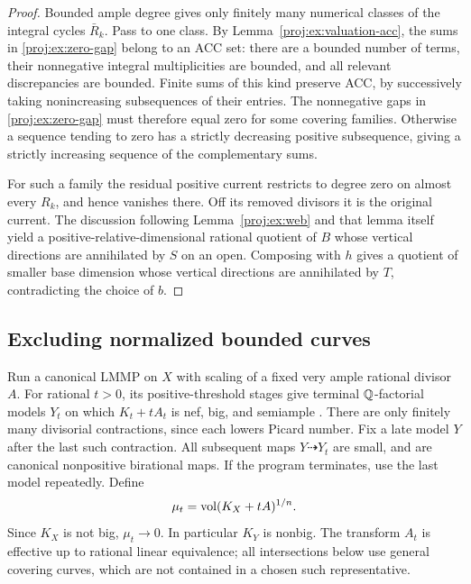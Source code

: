 \begin{proof}
Bounded ample degree gives only finitely many numerical
classes of the integral cycles \(\bar R_k\). Pass to one
class. By Lemma~\ref{proj:ex:valuation-acc}, the sums in
\eqref{proj:ex:zero-gap} belong to an ACC set: there are a bounded
number of terms, their nonnegative integral multiplicities
are bounded, and all relevant discrepancies are bounded.
Finite sums of this kind preserve ACC, by successively
taking nonincreasing subsequences of their entries.
The nonnegative gaps in \eqref{proj:ex:zero-gap} must therefore
equal zero for some covering families. Otherwise a sequence
tending to zero has a strictly decreasing positive
subsequence, giving a strictly increasing sequence of the
complementary sums.

For such a family the residual positive current restricts
to degree zero on almost every \(R_k\), and hence vanishes
there. Off its removed divisors it is the original current.
The discussion following Lemma~\ref{proj:ex:web} and that lemma
itself yield a positive-relative-dimensional rational
quotient of \(B\) whose vertical directions are annihilated
by \(S\) on an open. Composing with \(h\) gives a quotient
of smaller base dimension whose vertical directions are
annihilated by \(T\), contradicting the choice of \(b\).
\end{proof}

\subsection{Excluding normalized bounded curves}

Run a canonical LMMP on \(X\) with scaling of a fixed very ample
rational divisor \(A\). For rational \(t>0\), its positive-threshold
stages give terminal \(\mathbb{Q}\)-factorial models \(Y_t\) on which
\(K_t+tA_t\) is nef, big, and semiample
\cite{BCHM}. There are only finitely many divisorial
contractions, since each lowers Picard number. Fix a late model
\(Y\) after the last such contraction. All subsequent maps
\(Y\dashrightarrow Y_t\) are small, and are canonical
nonpositive birational maps. If the program terminates, use
the last model repeatedly. Define
\begin{equation}\label{proj:ex:volume-scale}
 \mu_t=\operatorname{vol}(K_X+tA)^{1/n}.
\end{equation}
Since \(K_X\) is not big, \(\mu_t\to0\). In particular \(K_Y\)
is nonbig. The transform \(A_t\) is effective up to rational
linear equivalence; all intersections below use general
covering curves, which are not contained in a chosen such
representative.

